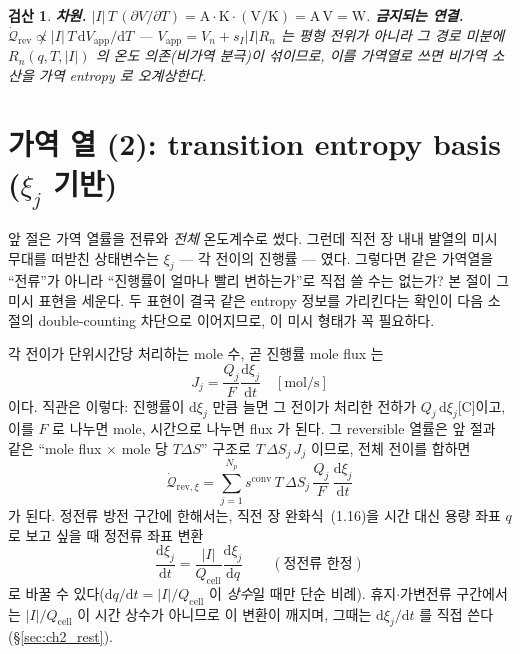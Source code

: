 \documentclass[11pt,a4paper]{article}
\newtheorem*{verifybox}{검산}
\newcommand{\dd}{\mathrm{d}}
\newcommand{\app}{\mathrm{app}}
\newcommand{\cell}{\mathrm{cell}}
\newcommand{\rev}{\mathrm{rev}}
\newcommand{\conv}{\mathrm{conv}}
\begin{document}
\begin{verifybox}
\textbf{차원.} $|I|\,T\,(\partial V/\partial T)=\mathrm A\cdot\mathrm K\cdot\mathrm{(V/K)}=\mathrm{A\,V}=\mathrm W$.
\textbf{금지되는 연결.} $\dot{\mathcal Q}_{\rev}\not\propto|I|\,T\,\dd V_\app/\dd T$ — $V_\app=V_n+s_I|I|R_n$ 는
평형 전위가 아니라 그 경로 미분에 $R_n(q,T,|I|)$ 의 온도 의존(비가역 분극)이 섞이므로, 이를 가역열로 쓰면 비가역
소산을 가역 entropy 로 오계상한다.
\end{verifybox}

\section{가역 열 (2): transition entropy basis ($\xi_j$ 기반)}\label{sec:ch2_revxi}
앞 절은 가역 열률을 전류와 \emph{전체} 온도계수로 썼다. 그런데 직전 장 내내 발열의 미시 무대를 떠받친 상태변수는
$\xi_j$ — 각 전이의 진행률 — 였다. 그렇다면 같은 가역열을 ``전류''가 아니라 ``진행률이 얼마나 빨리 변하는가''로
직접 쓸 수는 없는가? 본 절이 그 미시 표현을 세운다. 두 표현이 결국 같은 entropy 정보를 가리킨다는 확인이 다음
소절의 double-counting 차단으로 이어지므로, 이 미시 형태가 꼭 필요하다.

각 전이가 단위시간당 처리하는 mole 수, 곧 진행률 mole flux 는
\begin{equation}
J_j=\frac{Q_j}{F}\frac{\dd\xi_j}{\dd t}\quad[\mathrm{mol/s}]
\label{eq:ch2_Jdef}
\end{equation}
이다. 직관은 이렇다: 진행률이 $\dd\xi_j$ 만큼 늘면 그 전이가 처리한 전하가 $Q_j\,\dd\xi_j$[C]이고, 이를 $F$ 로
나누면 mole, 시간으로 나누면 flux 가 된다. 그 reversible 열률은 앞 절과 같은 ``mole flux $\times$ mole 당 $T\Delta S$''
구조로 $T\,\Delta S_j\,J_j$ 이므로, 전체 전이를 합하면
\begin{equation}
\dot{\mathcal Q}_{\rev,\xi}=\sum_{j=1}^{N_p}s^{\conv}\,T\,\Delta S_j\,\frac{Q_j}{F}\,\frac{\dd\xi_j}{\dd t}
\label{eq:ch2_revxi}
\end{equation}
가 된다. 정전류 방전 구간에 한해서는, 직전 장 완화식~(1.16)을 시간 대신 용량 좌표 $q$ 로 보고 싶을 때 정전류 좌표
변환
\begin{equation}
\frac{\dd\xi_j}{\dd t}=\frac{|I|}{Q_\cell}\frac{\dd\xi_j}{\dd q}\qquad(\text{정전류 한정})
\label{eq:ch2_revxi_q}
\end{equation}
로 바꿀 수 있다($\dd q/\dd t=|I|/Q_\cell$ 이 \emph{상수}일 때만 단순 비례). 휴지$\cdot$가변전류 구간에서는
$|I|/Q_\cell$ 이 시간 상수가 아니므로 이 변환이 깨지며, 그때는 $\dd\xi_j/\dd t$ 를 직접 쓴다(\S\ref{sec:ch2_rest}).
\end{document}
